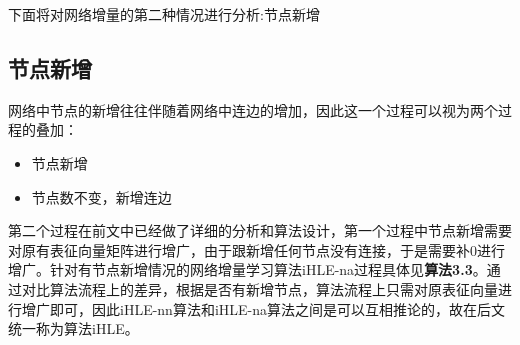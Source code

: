 下面将对网络增量的第二种情况进行分析:节点新增
\subsection{节点新增}
网络中节点的新增往往伴随着网络中连边的增加，因此这一个过程可以视为两个过程的叠加：
\begin{itemize}
	\item 节点新增
	\item 节点数不变，新增连边
\end{itemize}
第二个过程在前文中已经做了详细的分析和算法设计，第一个过程中节点新增需要对原有表征向量矩阵进行增广，由于跟新增任何节点没有连接，于是需要补0进行增广。针对有节点新增情况的网络增量学习算法iHLE-na过程具体见\textbf{算法3.3}。通过对比算法流程上的差异，根据是否有新增节点，算法流程上只需对原表征向量进行增广即可，因此iHLE-nn算法和iHLE-na算法之间是可以互相推论的，故在后文统一称为算法iHLE。

